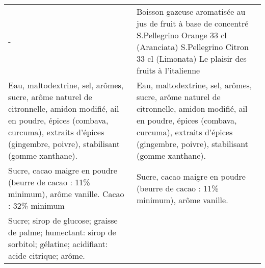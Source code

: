\begin{longtable}{p{7cm}p{7cm}}
                                                                                                                                                                                                                                                                                                      - &                                                                                                                           Boisson gazeuse aromatisée au jus de fruit à base de concentré \newline S.Pellegrino Orange 33 cl (Aranciata) \newline S.Pellegrino Citron 33 cl (Limonata) \newline Le plaisir des fruits à l’italienne \\
                                                                                                   Eau, maltodextrine, sel, arômes, sucre, arôme naturel de citronnelle, amidon modifié, ail en poudre, épices (combava, curcuma), extraits d'épices (gingembre, poivre), stabilisant (gomme xanthane). &                                                                                                  Eau, maltodextrine, sel, arômes, sucre, arôme naturel de citronnelle, amidon modifié, ail en poudre, épices (combava, curcuma), extraits  \newline d'épices (gingembre, poivre), stabilisant (gomme xanthane).    \\
                                                                                                                                                                                                     Sucre, cacao maigre en poudre (beurre de cacao : 11\% minimum), arôme vanille. \newline Cacao : 32\% minimum &                                                                                                                                                                                                                             Sucre, cacao maigre en poudre (beurre de cacao : 11\% minimum), arôme vanille.  \\
                                                                                                                                                                                  Sucre; sirop de glucose; graisse de palme; humectant: sirop de sorbitol; gélatine; acidifiant: acide citrique; arôme. &                                                                                                                                                                                                                                                                                                            \\

\end{longtable}
